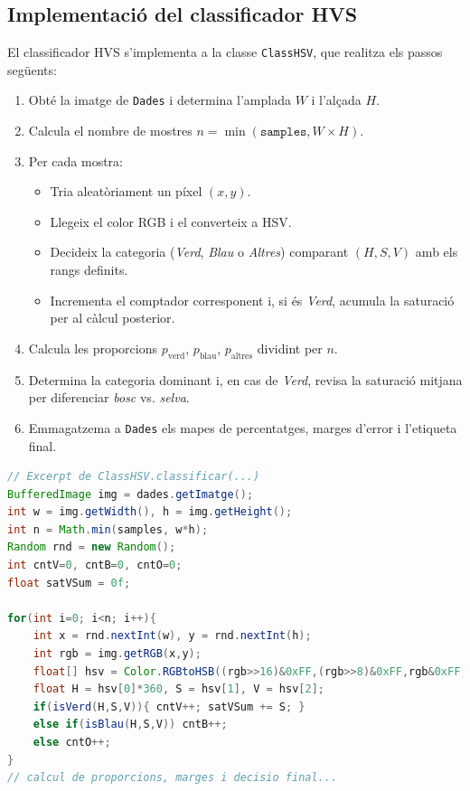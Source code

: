 \documentclass{ieeetj}
\begin{document}
\subsection{Implementació del classificador HVS}
El classificador HVS s’implementa a la classe \texttt{ClassHSV}, que realitza els passos següents:
\begin{enumerate}
  \item Obté la imatge de \texttt{Dades} i determina l’amplada $W$ i l’alçada $H$.
  \item Calcula el nombre de mostres $n = \min(\texttt{samples}, W\times H)$.
  \item Per cada mostra:
    \begin{itemize}
      \item Tria aleatòriament un píxel $(x,y)$.
      \item Llegeix el color RGB i el converteix a HSV.
      \item Decideix la categoria (\emph{Verd}, \emph{Blau} o \emph{Altres}) comparant $(H,S,V)$ amb els rangs definits.
      \item Incrementa el comptador corresponent i, si és \emph{Verd}, acumula la saturació per al càlcul posterior.
    \end{itemize}
  \item Calcula les proporcions $p_\text{verd}$, $p_\text{blau}$, $p_\text{altres}$ dividint per $n$.
  \item Determina la categoria dominant i, en cas de \emph{Verd}, revisa la saturació mitjana per diferenciar \emph{bosc} vs. \emph{selva}.
  \item Emmagatzema a \texttt{Dades} els mapes de percentatges, marges d’error i l’etiqueta final.
\end{enumerate}

\begin{lstlisting}[language = Java, breaklines = true]
// Excerpt de ClassHSV.classificar(...)
BufferedImage img = dades.getImatge();
int w = img.getWidth(), h = img.getHeight();
int n = Math.min(samples, w*h);
Random rnd = new Random();
int cntV=0, cntB=0, cntO=0;
float satVSum = 0f;

for(int i=0; i<n; i++){
    int x = rnd.nextInt(w), y = rnd.nextInt(h);
    int rgb = img.getRGB(x,y);
    float[] hsv = Color.RGBtoHSB((rgb>>16)&0xFF,(rgb>>8)&0xFF,rgb&0xFF,null);
    float H = hsv[0]*360, S = hsv[1], V = hsv[2];
    if(isVerd(H,S,V)){ cntV++; satVSum += S; }
    else if(isBlau(H,S,V)) cntB++;
    else cntO++;
}
// calcul de proporcions, marges i decisio final...
\end{lstlisting}
\end{document}
